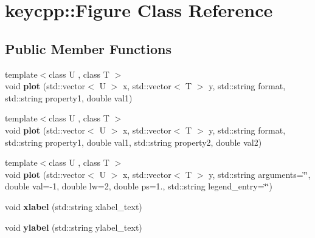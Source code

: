 \hypertarget{classkeycpp_1_1_figure}{\section{keycpp\-:\-:Figure Class Reference}
\label{classkeycpp_1_1_figure}
}
\subsection*{Public Member Functions}
\begin{DoxyCompactItemize}
\item 
\hypertarget{classkeycpp_1_1_figure_a6d2444603362a7782232662410b364aa}{{\footnotesize template$<$class U , class T $>$ }\\void {\bfseries plot} (std\-::vector$<$ U $>$ x, std\-::vector$<$ T $>$ y, std\-::string format, std\-::string property1, double val1)}\label{classkeycpp_1_1_figure_a6d2444603362a7782232662410b364aa}

\item 
\hypertarget{classkeycpp_1_1_figure_aa5761ef52842e596dca311c43920b7a0}{{\footnotesize template$<$class U , class T $>$ }\\void {\bfseries plot} (std\-::vector$<$ U $>$ x, std\-::vector$<$ T $>$ y, std\-::string format, std\-::string property1, double val1, std\-::string property2, double val2)}\label{classkeycpp_1_1_figure_aa5761ef52842e596dca311c43920b7a0}

\item 
\hypertarget{classkeycpp_1_1_figure_aa057f62607febd829d3e1a54801473f8}{{\footnotesize template$<$class U , class T $>$ }\\void {\bfseries plot} (std\-::vector$<$ U $>$ x, std\-::vector$<$ T $>$ y, std\-::string arguments=\char`\"{}\char`\"{}, double val=-\/1, double lw=2, double ps=1., std\-::string legend\-\_\-entry=\char`\"{}\char`\"{})}\label{classkeycpp_1_1_figure_aa057f62607febd829d3e1a54801473f8}

\item 
\hypertarget{classkeycpp_1_1_figure_addd610a718f021f3e6c7c94f9bc7f285}{void {\bfseries xlabel} (std\-::string xlabel\-\_\-text)}\label{classkeycpp_1_1_figure_addd610a718f021f3e6c7c94f9bc7f285}

\item 
\hypertarget{classkeycpp_1_1_figure_aa965967db2165b001860f75fc22c9f28}{void {\bfseries ylabel} (std\-::string ylabel\-\_\-text)}\label{classkeycpp_1_1_figure_aa965967db2165b001860f75fc22c9f28}


\end{DoxyCompactItemize}
